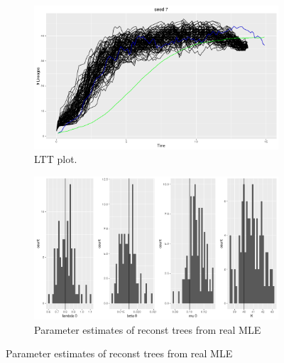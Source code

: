 \documentclass[10pt,a4paper]{article}
\begin{document}
\begin{figure}[t!]
\medskip
\begin{subfigure}{0.48\textwidth}
\includegraphics[width=\linewidth]{ph5.png}
\caption{LTT plot.} \label{fig:c}
\end{subfigure}\hspace*{\fill}
\begin{subfigure}{0.48\textwidth}
\includegraphics[width=\linewidth]{ph6.png}
\caption{Parameter estimates of reconst trees from real MLE} \label{fig:d}
\end{subfigure}


\end{figure}
\end{document}
